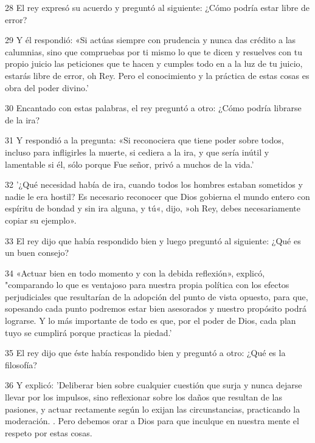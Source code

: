 \par 28 El rey expresó su acuerdo y preguntó al siguiente: ¿Cómo podría estar libre de error?

\par 29 Y él respondió: «Si actúas siempre con prudencia y nunca das crédito a las calumnias, sino que compruebas por ti mismo lo que te dicen y resuelves con tu propio juicio las peticiones que te hacen y cumples todo en a la luz de tu juicio, estarás libre de error, oh Rey. Pero el conocimiento y la práctica de estas cosas es obra del poder divino.'

\par 30 Encantado con estas palabras, el rey preguntó a otro: ¿Cómo podría librarse de la ira?

\par 31 Y respondió a la pregunta: «Si reconociera que tiene poder sobre todos, incluso para infligirles la muerte, si cediera a la ira, y que sería inútil y lamentable si él, sólo porque Fue señor, privó a muchos de la vida.'

\par 32 '¿Qué necesidad había de ira, cuando todos los hombres estaban sometidos y nadie le era hostil? Es necesario reconocer que Dios gobierna el mundo entero con espíritu de bondad y sin ira alguna, y tú«, dijo, »oh Rey, debes necesariamente copiar su ejemplo».

\par 33 El rey dijo que había respondido bien y luego preguntó al siguiente: ¿Qué es un buen consejo?

\par 34 «Actuar bien en todo momento y con la debida reflexión», explicó, "comparando lo que es ventajoso para nuestra propia política con los efectos perjudiciales que resultarían de la adopción del punto de vista opuesto, para que, sopesando cada punto podremos estar bien asesorados y nuestro propósito podrá lograrse. Y lo más importante de todo es que, por el poder de Dios, cada plan tuyo se cumplirá porque practicas la piedad.'

\par 35 El rey dijo que éste había respondido bien y preguntó a otro: ¿Qué es la filosofía?

\par 36 Y explicó: 'Deliberar bien sobre cualquier cuestión que surja y nunca dejarse llevar por los impulsos, sino reflexionar sobre los daños que resultan de las pasiones, y actuar rectamente según lo exijan las circunstancias, practicando la moderación. . Pero debemos orar a Dios para que inculque en nuestra mente el respeto por estas cosas.

